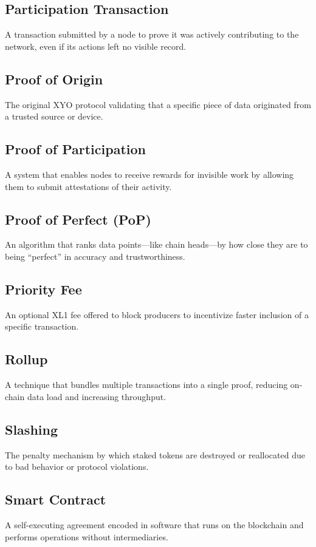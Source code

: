 \documentclass{article}
\begin{document}
\subsection*{Participation Transaction}
A transaction submitted by a node to prove it was actively contributing to the network, even if its actions left no visible record.

\subsection*{Proof of Origin}
The original XYO protocol validating that a specific piece of data originated from a trusted source or device.

\subsection*{Proof of Participation}
A system that enables nodes to receive rewards for invisible work by allowing them to submit attestations of their activity.

\subsection*{Proof of Perfect (PoP)}
An algorithm that ranks data points—like chain heads—by how close they are to being “perfect” in accuracy and trustworthiness.

\subsection*{Priority Fee}
An optional XL1 fee offered to block producers to incentivize faster inclusion of a specific transaction.

\subsection*{Rollup}
A technique that bundles multiple transactions into a single proof, reducing on-chain data load and increasing throughput.

\subsection*{Slashing}
The penalty mechanism by which staked tokens are destroyed or reallocated due to bad behavior or protocol violations.

\subsection*{Smart Contract}
A self-executing agreement encoded in software that runs on the blockchain and performs operations without intermediaries.
\end{document}
